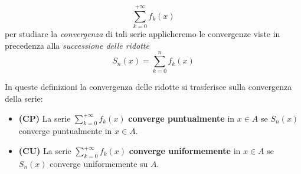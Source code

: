 \begin{equation*}
	\sum_{k=0}^{+\infty}f_k(x)
\end{equation*}
per studiare la \textit{convergenza} di tali serie applicheremo le convergenze viste in precedenza alla \textit{successione delle ridotte}
\begin{equation*}
	S_n(x)=\sum_{k=0}^{n}f_k(x)
\end{equation*}
\begin{define}
In queste definizioni la convergenza delle ridotte si trasferisce sulla convergenza della serie:
	\begin{itemize}
		\item \textbf{(CP)} La serie $\displaystyle\sum_{k=0}^{+\infty}f_k(x)$ \textbf{converge puntualmente} in $x\in A$ se $S_n(x)$ converge puntualmente in $x\in A$.
		\item \textbf{(CU)} La serie $\displaystyle\sum_{k=0}^{+\infty}f_k(x)$ \textbf{converge uniformemente} in $x\in A$ se $S_n(x)$ converge uniformemente su $A$.
	\end{itemize}
\end{define}
